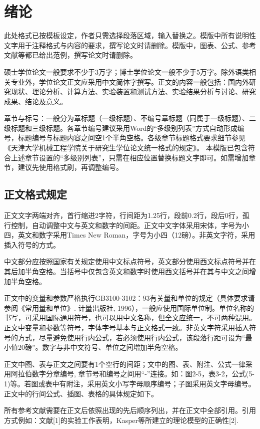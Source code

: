 
\chapter{绪\quad 论}
此处格式已按模板设定，作者只需选择段落区域，输入替换之。模版中所有说明性文字用于注释格式与内容的要求，撰写论文时请删除。模版中，图表、公式、参考文献等都已给出范例，撰写论文时请删除。

硕士学位论文一般要求不少于3万字；博士学位论文一般不少于5万字。除外语类相关专业外，学位论文正文应采用中文简体字撰写。正文的内容一般包括：国内外研究现状、理论分析、计算方法、实验装置和测试方法、实验结果分析与讨论、研究成果、结论及意义。

章节与标号：一般分为章标题（一级标题）、不编号章标题（同属于一级标题）、二级标题和三级标题。各章节编号建议采用Word的“多级别列表”方式自动形成编号，标题编号与标题内容之间空1个半角空格。各级章节标题格式要求细节参见《天津大学机械工程学院关于研究生学位论文统一格式的规定》。
本模版已包含符合上述章节设置的“多级别列表”，只需在相应位置替换标题文字即可。如需增加章节，建议先使用格式刷，再调整编号。

\section{正文格式规定}
正文文字两端对齐，首行缩进2字符，行间距为1.25行，段前0.2行，段后0行，孤行控制，自动调整中文与英文和数字的间距。正文中文字体采用宋体，字号为小四，英文和数字采用Times New Roman，字号为小四（12磅）。非英文字符，采用插入符号的方式。

中文部分应按照国家有关规定使用中文标点符号，英文部分使用西文标点符号并在其后加半角空格。当括号中仅包含英文和数字时使用西文括号并在其与中文之间增加半角空格。

正文中的变量和参数严格执行GB3100-3102：93有关量和单位的规定（具体要求请参阅《常用量和单位》. 计量出版社, 1996），一般应使用国际单位制。单位名称的书写，可采用国际通用符号，也可以用中文名称，但全文应统一，不可两种混用。正文中变量和参数等符号，字体字号基本与正文格式一致。非英文字符采用插入符号的方式，尽量避免使用行内公式，若必须使用行内公式，该段落行距可设为“最小值20磅”。数字与非中文符号、单位之间增加半角空格。

正文中图、表与正文之间要有1个空行的间距；文中的图、表、附注、公式一律采用阿拉伯数字分章编号, 章节号和编号之间用“-”连接。如：图2-5，表3-2，公式(5-1)等。若图或表中有附注，采用英文小写字母顺序编号；子图采用英文字母编号。正文中的行间公式、插图、表格的具体规定如下。

所有参考文献需要在正文后依照出现的先后顺序列出，并在正文中全部引用。引用方式例如：文献[1]的实验工作表明，Kasper等所建立的理论模型的正确性[2].

